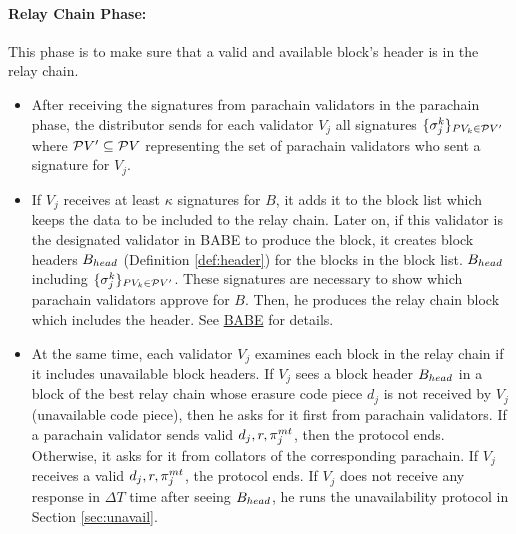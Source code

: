  


\paragraph{Relay Chain Phase:} This phase is to make sure that a valid and available block's header is in the relay chain. 

\begin{itemize}
    \item After receiving the signatures from parachain validators in the parachain phase, the distributor sends  for each validator $V_j$ all signatures  $\{\sigma_j^k\}_{PV_k \in \mathcal{P}V'} $ where $\mathcal{P}V' \subseteq \mathcal{P}V$ representing the set of parachain validators who sent a signature for $V_j$. 

    \item If $V_j$ receives at least $\kappa$ signatures for $B$, it adds it to the block list which keeps the data to be included to the relay chain. Later on, if this validator is the designated validator in BABE to produce the block, it creates block headers $B_{head}$ (Definition \ref{def:header}) for the blocks in the block list. $B_{head}$ including $\{\sigma_j^k\}_{PV_k \in \mathcal{P}V'} $.  These signatures are necessary to show which parachain validators approve for $B$. Then, he produces the relay chain block which includes the header. See \href{http://research.web3.foundation/en/latest/polkadot/BABE/Babe/}{BABE} for details.

    \item At the same time, each validator $V_j$ examines  each block in the relay chain if it includes unavailable block headers. If $V_j$ sees a block header $B_{head}$ in a block of the best relay chain whose erasure code piece $d_j$ is not received by $V_j$ (unavailable code piece), then he asks for it first from parachain validators. If a parachain validator sends valid $d_j, r, \pi^{mt}_j $, then the protocol ends. Otherwise, it asks for it from collators of the corresponding parachain. If $V_j$ receives a valid $d_j, r, \pi^{mt}_j $, the protocol ends. If $V_j$ does not receive any response in $\Delta T$ time after seeing $B_{head}$, he runs the unavailability protocol in Section \ref{sec:unavail}.

\end{itemize}

